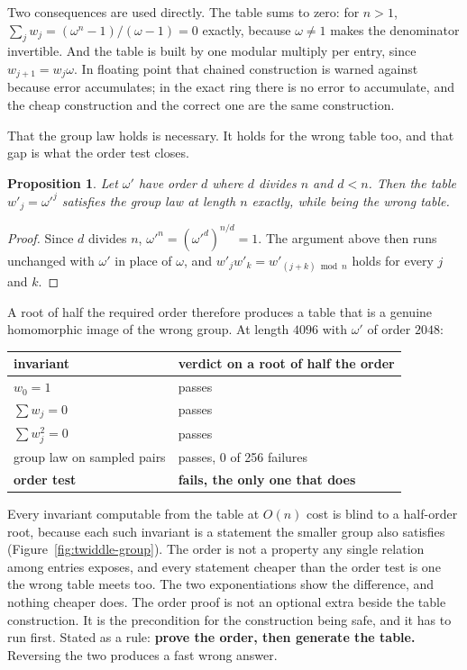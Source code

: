 \documentclass{article}
\newtheorem{proposition}{Proposition}
\begin{document}
Two consequences are used directly. The table sums to zero: for \(n > 1\), \(\sum_j w_j = (\omega^n - 1)/(\omega - 1) = 0\) exactly, because \(\omega \ne 1\) makes the denominator invertible. And the table is built by one modular multiply per entry, since \(w_{j+1} = w_j \omega\). In floating point that chained construction is warned against because error accumulates; in the exact ring there is no error to accumulate, and the cheap construction and the correct one are the same construction.

That the group law holds is necessary. It holds for the wrong table too, and that gap is what the order test closes.

\begin{proposition}
Let \(\omega'\) have order \(d\) where \(d\) divides \(n\) and \(d < n\). Then the table \(w'_j = \omega'^j\) satisfies the group law at length \(n\) exactly, while being the wrong table.
\end{proposition}

\begin{proof}
Since \(d\) divides \(n\), \(\omega'^n = (\omega'^d)^{n/d} = 1\). The argument above then runs unchanged with \(\omega'\) in place of \(\omega\), and \(w'_j w'_k = w'_{(j+k) \bmod n}\) holds for every \(j\) and \(k\).
\end{proof}

A root of half the required order therefore produces a table that is a genuine homomorphic image of the wrong group. At length \(4096\) with \(\omega'\) of order \(2048\):

\begin{center}
\begin{tabular}{@{}ll@{}}
\toprule
invariant & verdict on a root of half the order \\
\midrule
\(w_0 = 1\) & passes \\
\(\sum w_j = 0\) & passes \\
\(\sum w_j^2 = 0\) & passes \\
group law on sampled pairs & passes, 0 of 256 failures \\
\textbf{order test} & \textbf{fails, the only one that does} \\
\bottomrule
\end{tabular}
\end{center}

Every invariant computable from the table at \(O(n)\) cost is blind to a half-order root, because each such invariant is a statement the smaller group also satisfies (Figure~\ref{fig:twiddle-group}). The order is not a property any single relation among entries exposes, and every statement cheaper than the order test is one the wrong table meets too. The two exponentiations show the difference, and nothing cheaper does. The order proof is not an optional extra beside the table construction. It is the precondition for the construction being safe, and it has to run first. Stated as a rule: \textbf{prove the order, then generate the table.} Reversing the two produces a fast wrong answer.
\end{document}
